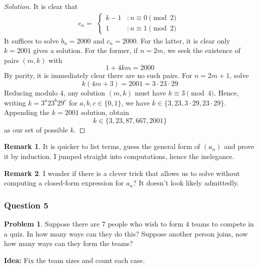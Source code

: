 \documentclass[11pt]{article}
\theoremstyle{definition}
\newtheorem*{problem}{Problem}
\newtheorem*{remark}{Remark}
\begin{document}
\begin{proof}[Solution]
    It is clear that
    \[c_n =  \begin{aligned}\begin{cases} k - 1 &: n \equiv 0 \pmod 2 \\ 1 &: n \equiv 1 \pmod 2\end{cases}\end{aligned}\]
    It suffices to solve $b_n = 2000$ and $c_n = 2000$. For the latter, it is clear only $k=2001$ gives a solution.
    For the former, if $n=2m$, we seek the existence of pairs $(m, k)$ with 
    \[1 + 4km = 2000\]
    By parity, it is immediately clear there are no such pairs. For $n = 2m+1$, solve
    \[k(4m+3) = 2001 = 3 \cdot 23 \cdot 29\]
    Reducing modulo $4$, any solution $(m, k)$ must have $k \equiv 3 \pmod 4$. Hence, writing $k = 3^a 23^b 29^c$ for 
    $a,b,c \in \{0,1\}$, we have $k \in \{3, 23, 3 \cdot 29, 23 \cdot 29\}$. Appending the $k=2001$ solution, 
    obtain \[k \in \{3, 23, 87, 667, 2001\}\]
    as our set of possible $k$.
\end{proof}

\begin{remark}
    It is quicker to list terms, guess the general form of $(a_n)$ and prove it by induction. I jumped straight into 
    computations, hence the inelegance. 
\end{remark}

\begin{remark}
  I wonder if there is a clever trick that allows us to solve without computing a closed-form expression for $a_n$? 
  It doesn't look likely admittedly.
\end{remark}

\newpage

\subsubsection{Question 5}

\begin{problem}
    Suppose there are $7$ people who wish to form $4$ teams to compete in a quiz. In how many ways can they do this? 
    Suppose another person joins, now how many ways can they form the teams?
\end{problem}

{\bf Idea: } Fix the team sizes and count each case. 
\end{document}
